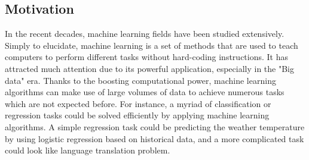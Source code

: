 

\subsection{Motivation}

In the recent decades, machine learning fields have been studied extensively. Simply to elucidate, machine learning is a set of methods that are used to teach computers to perform different tasks without hard-coding instructions. It has attracted much attention due to its powerful application, especially in the "Big data" era. Thanks to the boosting computational power, machine learning algorithms can make use of large volumes of data to achieve numerous tasks which are not expected before. For instance, a myriad of classification or regression tasks could be solved efficiently by applying machine learning algorithms. A simple regression task could be predicting the weather temperature by using logistic regression based on historical data, and a more complicated task could look like language translation problem. 

